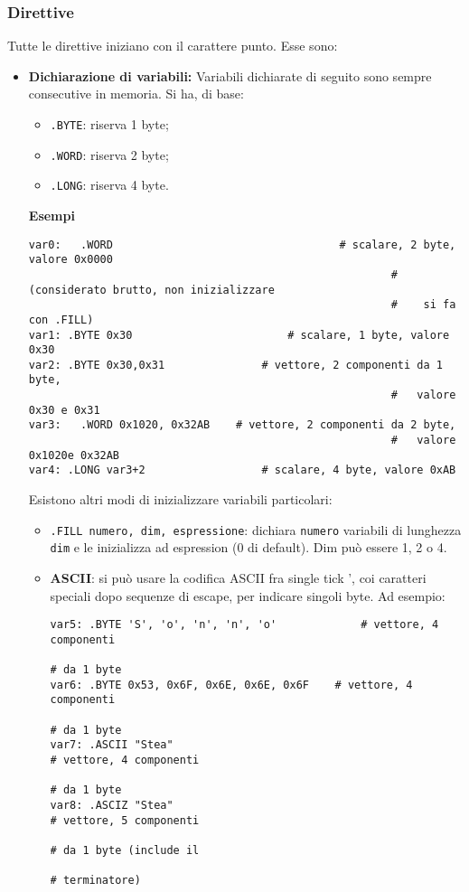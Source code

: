 \documentclass[a4paper,11pt]{article}
\begin{document}
\subsubsection{Direttive}
Tutte le direttive iniziano con il carattere punto.
Esse sono:
\begin{itemize}
	\item \textbf{Dichiarazione di variabili:}
		Variabili dichiarate di seguito sono sempre consecutive in memoria. Si ha, di base:
		\begin{itemize}
			\item \lstinline|.BYTE|: riserva 1 byte;
			\item \lstinline|.WORD|: riserva 2 byte;
			\item \lstinline|.LONG|: riserva 4 byte.
		\end{itemize}
	\textsf{\textbf{Esempi}}
\begin{lstlisting}	
var0:	.WORD									# scalare, 2 byte, valore 0x0000 
														#	(considerato brutto, non inizializzare
														#	 si fa con .FILL)
var1: .BYTE 0x30						# scalare, 1 byte, valore 0x30
var2: .BYTE 0x30,0x31				# vettore, 2 componenti da 1 byte, 
														#	valore 0x30 e 0x31
var3:	.WORD 0x1020, 0x32AB	# vettore, 2 componenti da 2 byte, 
														#	valore 0x1020e 0x32AB
var4: .LONG var3+2					# scalare, 4 byte, valore 0xAB
\end{lstlisting}
\par\smallskip 
Esistono altri modi di inizializzare variabili particolari:
\begin{itemize}
	\item \lstinline|.FILL numero, dim, espressione|: dichiara \lstinline|numero| variabili di lunghezza \lstinline|dim| e le inizializza ad espression (0 di default).
		Dim può essere 1, 2 o 4.
	\item \textbf{ASCII}: si può usare la codifica ASCII fra single tick ', coi caratteri speciali dopo sequenze di escape, per indicare singoli byte. Ad esempio:
\begin{lstlisting}	
var5: .BYTE 'S', 'o', 'n', 'n', 'o'				# vettore, 4 componenti 
																					# da 1 byte
var6: .BYTE 0x53, 0x6F, 0x6E, 0x6E, 0x6F	# vettore, 4 componenti 
																					# da 1 byte
var7: .ASCII "Stea"												# vettore, 4 componenti
																					# da 1 byte
var8: .ASCIZ "Stea"												# vettore, 5 componenti 
																					# da 1 byte (include il 
																					# terminatore)
	\end{lstlisting} 
\end{itemize}

\end{itemize}
\end{document}
